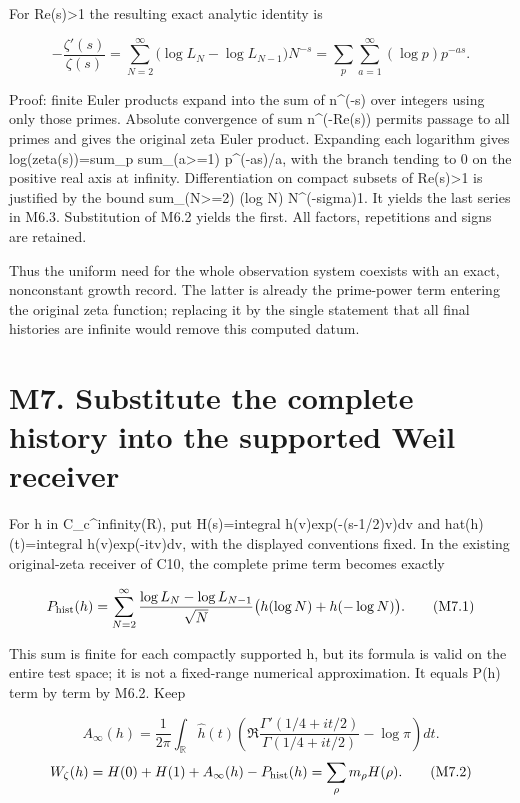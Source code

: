 For Re(s)\textgreater1 the resulting exact analytic identity is

\[
\boxed{-\frac{\zeta'(s)}{\zeta(s)}
=\sum_{N=2}^{\infty}
\bigl(\log L_N-\log L_{N-1}\bigr)N^{-s}
=\sum_p\sum_{a=1}^{\infty}(\log p)p^{-as}.}
\tag{M6.3}
\]

Proof: finite Euler products expand into the sum of n\^{}(-s) over
integers using only those primes. Absolute convergence of sum
n\^{}(-Re(s)) permits passage to all primes and gives the original zeta
Euler product. Expanding each logarithm gives log(zeta(s))=sum\_p
sum\_(a\textgreater=1) p\^{}(-as)/a, with the branch tending to 0 on the
positive real axis at infinity. Differentiation on compact subsets of
Re(s)\textgreater1 is justified by the bound sum\_(N\textgreater=2) (log
N) N\^{}(-sigma)1. It yields the last series in M6.3. Substitution of
M6.2 yields the first. All factors, repetitions and signs are retained.

Thus the uniform need for the whole observation system coexists with an
exact, nonconstant growth record. The latter is already the prime-power
term entering the original zeta function; replacing it by the single
statement that all final histories are infinite would remove this
computed datum.

\section{M7. Substitute the complete history into the supported Weil
receiver}\label{m7.-substitute-the-complete-history-into-the-supported-weil-receiver}

For h in C\_c\^{}infinity(R), put H(s)=integral h(v)exp(-(s-1/2)v)dv and
hat(h)(t)=integral h(v)exp(-itv)dv, with the displayed conventions
fixed. In the existing original-zeta receiver of C10, the complete prime
term becomes exactly

\[
P_{\rm hist}(h)=\sum_{N=2}^{\infty}
\frac{\log L_N-\log L_{N-1}}{\sqrt N}
\bigl(h(\log N)+h(-\log N)\bigr).
\tag{M7.1}
\]

This sum is finite for each compactly supported h, but its formula is
valid on the entire test space; it is not a fixed-range numerical
approximation. It equals P(h) term by term by M6.2. Keep

\[
A_\infty(h)=\frac1{2\pi}\int_{\mathbb R}\widehat h(t)
\left(\Re\frac{\Gamma'(1/4+it/2)}{\Gamma(1/4+it/2)}-\log\pi\right)dt.
\] \[
W_\zeta(h)=H(0)+H(1)+A_\infty(h)-P_{\rm hist}(h)
=\sum_\rho m_\rho H(\rho).
\tag{M7.2}
\]

